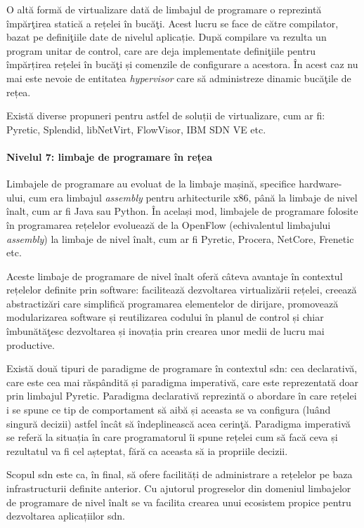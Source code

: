 O altă formă de virtualizare dată de limbajul de programare o reprezintă împărţirea statică a rețelei în bucăţi. Acest lucru se face de către compilator, bazat pe definiţiile date de nivelul aplicație. După compilare va rezulta un program unitar de control, care are deja implementate definiţiile pentru împărțirea rețelei în bucăţi și comenzile de configurare a acestora. În acest caz nu mai este nevoie de entitatea \textit{hypervisor} care să administreze dinamic bucăţile de rețea.

Există diverse propuneri pentru astfel de soluții de virtualizare, cum ar fi: Pyretic, Splendid, libNetVirt, FlowVisor, IBM SDN VE etc.

\paragraph{Nivelul 7: limbaje de programare în rețea}

Limbajele de programare au evoluat de la limbaje mașină, specifice hardware-ului, cum era limbajul \textit{assembly} pentru arhitecturile x86, până la limbaje de nivel înalt, cum ar fi Java sau Python. În același mod, limbajele de programare folosite în programarea rețelelor evoluează de la OpenFlow (echivalentul limbajului \textit{assembly}) la limbaje de nivel înalt, cum ar fi Pyretic, Procera, NetCore, Frenetic etc.

Aceste limbaje de programare de nivel înalt oferă câteva avantaje în contextul rețelelor definite prin software: facilitează dezvoltarea virtualizării rețelei, creează abstractizări care simplifică programarea elementelor de dirijare, promovează modularizarea software și reutilizarea codului în planul de control și chiar îmbunătăţesc dezvoltarea și inovația prin crearea unor medii de lucru mai productive.

Există două tipuri de paradigme de programare în contextul \gls{sdn}: cea declarativă, care este cea mai răspândită și paradigma imperativă, care este reprezentată doar prin limbajul Pyretic. Paradigma declarativă reprezintă o abordare în care rețelei i se spune ce tip de comportament să aibă și aceasta se va configura (luând singură decizii) astfel încât să îndeplinească acea cerinţă. Paradigma imperativă se referă la situația în care programatorul îi spune rețelei cum să facă ceva și rezultatul va fi cel așteptat, fără ca aceasta să ia propriile decizii.

Scopul \gls{sdn} este ca, în final, să ofere facilități de administrare a rețelelor pe baza infrastructurii definite anterior. Cu ajutorul progreselor din domeniul limbajelor de programare de nivel înalt se va facilita crearea unui ecosistem propice pentru dezvoltarea aplicațiilor \gls{sdn}.

